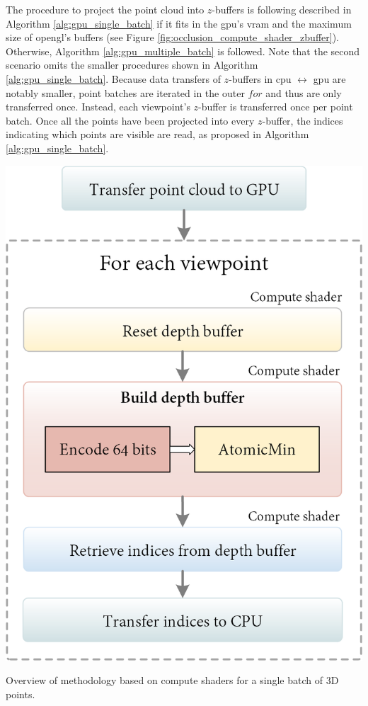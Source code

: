 The procedure to project the point cloud into $z$-buffers is following described in Algorithm \ref{alg:gpu_single_batch} if it fits in the \acrshort{gpu}'s \acrshort{vram} and the maximum size of \acrshort{opengl}'s buffers (see Figure \ref{fig:occlusion_compute_shader_zbuffer}). Otherwise, Algorithm \ref{alg:gpu_multiple_batch} is followed. Note that the second scenario omits the smaller procedures shown in Algorithm \ref{alg:gpu_single_batch}. Because data transfers of $z$-buffers in \acrshort{cpu} $\leftrightarrow$ \acrshort{gpu} are notably smaller, point batches are iterated in the outer $\textit{for}$ and thus are only transferred once. Instead, each viewpoint's $z$-buffer is transferred once per point batch. Once all the points have been projected into every $z$-buffer, the indices indicating which points are visible are read, as proposed in Algorithm \ref{alg:gpu_single_batch}.
\begin{marginfigure}[.3cm]
    \includegraphics[width=\linewidth]{figs/multi_thermal_projection/occlusion_compute_shader.png}
    \caption{Overview of methodology based on compute shaders for a single batch of 3D points.}
    \label{fig:occlusion_compute_shader_zbuffer}
\end{marginfigure}

